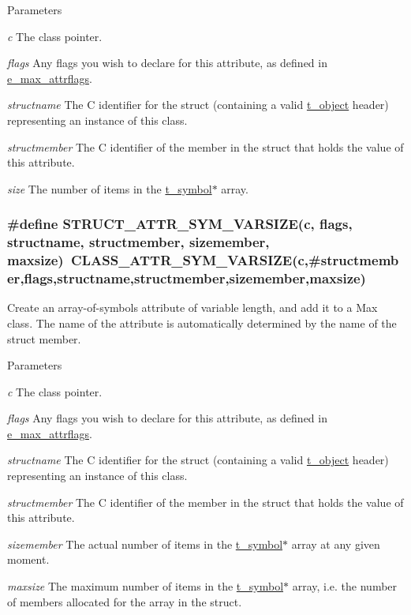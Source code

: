 \begin{DoxyParams}{Parameters}
\item[{\em c}]The class pointer. \item[{\em flags}]Any flags you wish to declare for this attribute, as defined in \hyperlink{group__attr_gaf296cfc6741bb19207f6ed8062809115}{e\_\-max\_\-attrflags}. \item[{\em structname}]The C identifier for the struct (containing a valid \hyperlink{structt__object}{t\_\-object} header) representing an instance of this class. \item[{\em structmember}]The C identifier of the member in the struct that holds the value of this attribute. \item[{\em size}]The number of items in the \hyperlink{structt__symbol}{t\_\-symbol}$\ast$ array. \end{DoxyParams}
\hypertarget{group__attr_gafd8c39b5fa81d7ef014ca6292cc8e0d5}{
\subsubsection[{STRUCT\_\-ATTR\_\-SYM\_\-VARSIZE}]{\setlength{\rightskip}{0pt plus 5cm}\#define STRUCT\_\-ATTR\_\-SYM\_\-VARSIZE(c, \/  flags, \/  structname, \/  structmember, \/  sizemember, \/  maxsize)~CLASS\_\-ATTR\_\-SYM\_\-VARSIZE(c,\#structmember,flags,structname,structmember,sizemember,maxsize)}}
\label{group__attr_gafd8c39b5fa81d7ef014ca6292cc8e0d5}


Create an array-\/of-\/symbols attribute of variable length, and add it to a Max class. The name of the attribute is automatically determined by the name of the struct member.


\begin{DoxyParams}{Parameters}
\item[{\em c}]The class pointer. \item[{\em flags}]Any flags you wish to declare for this attribute, as defined in \hyperlink{group__attr_gaf296cfc6741bb19207f6ed8062809115}{e\_\-max\_\-attrflags}. \item[{\em structname}]The C identifier for the struct (containing a valid \hyperlink{structt__object}{t\_\-object} header) representing an instance of this class. \item[{\em structmember}]The C identifier of the member in the struct that holds the value of this attribute. \item[{\em sizemember}]The actual number of items in the \hyperlink{structt__symbol}{t\_\-symbol}$\ast$ array at any given moment. \item[{\em maxsize}]The maximum number of items in the \hyperlink{structt__symbol}{t\_\-symbol}$\ast$ array, i.e. the number of members allocated for the array in the struct. \end{DoxyParams}


